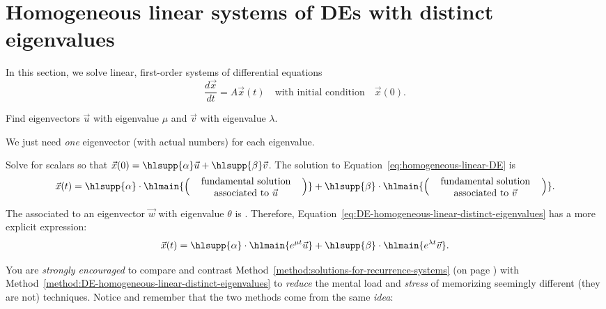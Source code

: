 \documentclass[../main.tex]{subfiles}
\begin{document}
 \section{Homogeneous linear systems of DEs with distinct eigenvalues}
  
In this section, we solve linear, first-order systems of differential equations 
\begin{equation} \label{eq:homogeneous-linear-DE}
  \frac{d\vec{x}}{dt} = A \vec{x}(t) \quad\text{with initial condition}\quad \vec{x}(0).
\end{equation}

\begin{method} \label{method:DE-homogeneous-linear-distinct-eigenvalues}
  Find eigenvectors \(\vec{u}\) with eigenvalue \(\mu\) and \(\vec{v}\) with eigenvalue \(\lambda\).

  We just need \emph{one} eigenvector (with actual numbers) for each eigenvalue. 

  Solve for scalars \hlsupp{\(\alpha, \beta\)} so that \(\vec{x}(0) = \hlsupp{\alpha} \vec{u} + \hlsupp{\beta} \vec{v}\). The solution to Equation~\eqref{eq:homogeneous-linear-DE} is
  \begin{equation} \label{eq:DE-homogeneous-linear-distinct-eigenvalues}
    \vec{x}(t) = \hlsupp{\alpha} \cdot \hlmain{\left( \parbox[c]{1.6in}{\centering fundamental solution associated to \(\vec{u}\)} \right) } + \hlsupp{\beta} \cdot \hlmain{\left( \parbox[c]{1.6in}{\centering fundamental solution associated to \(\vec{v}\)} \right)}.
  \end{equation}

  The  associated to an eigenvector \(\vec{w}\) with eigenvalue \(\theta\) is .  Therefore, Equation~\ref{eq:DE-homogeneous-linear-distinct-eigenvalues} has a more explicit expression:
  \[
    \vec{x}(t) = \hlsupp{\alpha} \cdot \hlmain{e^{\mu t} \vec{u}} + \hlsupp{\beta} \cdot \hlmain{e^{\lambda t} \vec{v}}.
  \]
\end{method}

You are \emph{strongly encouraged} to compare and contrast Method~\ref{method:solutions-for-recurrence-systems} (on page \pageref{eq:solutions-for-recurrence-systems}) with Method~\ref{method:DE-homogeneous-linear-distinct-eigenvalues} to \emph{reduce} the mental load and \emph{stress} of memorizing seemingly different (they are not) techniques. Notice and remember that the two methods come from the same \emph{idea}:  
\end{document}

